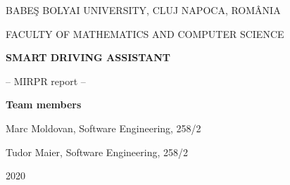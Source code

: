 \documentclass[12pt]{report}
\date{}
\renewcommand{\_}{\kern-1.5pt\textunderscore\kern-1.5pt}
\begin{document}
\begin{titlepage}
\sloppy
\begin{center}
BABE\c S BOLYAI UNIVERSITY, CLUJ NAPOCA, ROM\^ ANIA

FACULTY OF MATHEMATICS AND COMPUTER SCIENCE

\vspace{6cm}

\Huge \textbf{SMART DRIVING ASSISTANT}

\vspace{1cm}

\normalsize -- MIRPR report --

\end{center}


\vspace{5cm}

\begin{flushright}
\Large{\textbf{Team members}}\\
\begin{FlushRight}
{\fontsize{14pt}{16.8pt}\selectfont Marc Moldovan, Software Engineering, 258/2\par}
\end{FlushRight}\par

\begin{FlushRight}
{\fontsize{14pt}{16.8pt}\selectfont Tudor Maier, Software Engineering, 258/2\par}
\end{FlushRight}\par
\end{flushright}

\vspace{4cm}

\begin{center}
2020
\end{center}

\end{titlepage}
\par



\vspace{\baselineskip}

\vspace{\baselineskip}

\vspace{\baselineskip}

\vspace{\baselineskip}
\par

\vspace{\baselineskip}
\end{document}
